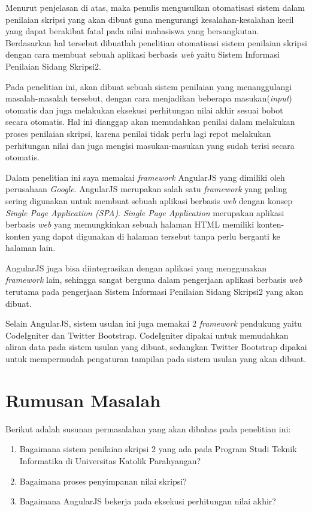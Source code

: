 	Menurut penjelasan di atas, maka penulis mengusulkan otomatisasi sistem dalam penilaian skripsi yang akan dibuat guna mengurangi kesalahan-kesalahan kecil yang dapat berakibat fatal pada nilai mahasiswa yang bersangkutan. Berdasarkan hal tersebut dibuatlah penelitian otomatisasi sistem penilaian skripsi dengan cara membuat sebuah aplikasi berbasis \textit{web} yaitu Sistem Informasi Penilaian Sidang Skripsi2.
		
	Pada penelitian ini, akan dibuat sebuah sistem penilaian yang menanggulangi masalah-masalah tersebut, dengan cara menjadikan beberapa masukan(\textit{input}) otomatis dan juga melakukan eksekusi perhitungan nilai akhir sesuai bobot secara otomatis. Hal ini dianggap akan memudahkan penilai dalam melakukan proses penilaian skripsi, karena penilai tidak perlu lagi repot melakukan perhitungan nilai dan juga mengisi masukan-masukan yang sudah terisi secara otomatis.
	
	Dalam penelitian ini saya memakai \textit{framework} AngularJS yang dimiliki oleh perusahaan \textit{Google}. AngularJS merupakan salah satu \textit{framework} yang paling sering digunakan untuk membuat sebuah aplikasi berbasis \textit{web} dengan konsep \textit{Single Page Application (SPA)}. \textit{Single Page Application} merupakan aplikasi berbasis \textit{web} yang memungkinkan sebuah halaman HTML memiliki konten-konten yang dapat digunakan di halaman tersebut tanpa perlu berganti ke halaman lain.
	
	AngularJS juga bisa diintegrasikan dengan aplikasi yang menggunakan \textit{framework} lain, sehingga sangat berguna dalam pengerjaan aplikasi berbasis \textit{web} terutama pada pengerjaan Sistem Informasi Penilaian Sidang Skripsi2 yang akan dibuat.
	
	Selain AngularJS, sistem usulan ini juga memakai 2 \textit{framework} pendukung yaitu CodeIgniter dan Twitter Bootstrap. CodeIgniter dipakai untuk memudahkan aliran data pada sistem usulan yang dibuat, sedangkan Twitter Bootstrap dipakai untuk mempermudah pengaturan tampilan pada sistem usulan yang akan dibuat.
	
\section{Rumusan Masalah}
\label{sec: rumusanMasalah}

	Berikut adalah susunan permasalahan yang akan dibahas pada penelitian ini:
	\begin{enumerate}
		\item Bagaimana sistem penilaian skripsi 2 yang ada pada Program Studi Teknik Informatika di Universitas Katolik Parahyangan?
		\item Bagaimana proses penyimpanan nilai skripsi?
		\item Bagaimana AngularJS bekerja pada eksekusi perhitungan nilai akhir?
	\end{enumerate}

